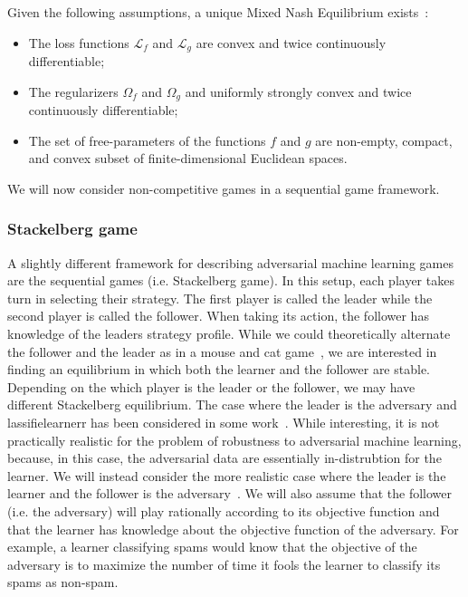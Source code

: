 Given the following assumptions, a unique Mixed Nash Equilibrium exists~\cite{bruckner_static_aml}:
\begin{itemize}
    \item The loss functions $\mathcal{L}_f$ and $\mathcal{L}_g$ are convex and twice continuously differentiable;
    \item The regularizers $\Omega_f$ and $\Omega_g$ and uniformly strongly convex and twice continuously differentiable;
    \item The set of free-parameters of the functions $f$ and $g$ are non-empty, compact, and convex subset of finite-dimensional Euclidean spaces.
\end{itemize}

We will now consider non-competitive games in a sequential game framework.

\subsubsection{Stackelberg game} A slightly different framework for describing adversarial machine learning games are the sequential games (i.e. Stackelberg game). In this setup, each player takes turn in selecting their strategy. The first player is called the leader while the second player is called the follower. When taking its action, the follower has knowledge of the leaders strategy profile. While we could theoretically alternate the follower and the leader as in a mouse and cat game~\cite{barreno_security_ml}, we are interested in finding an equilibrium in which both the learner and the follower are stable. Depending on the which player is the leader or the follower, we may have different Stackelberg equilibrium. The case where the leader is the adversary and lassifielearnerr has been considered in some work~\cite{murat_adversarial_classification,liu_game_theoretical_aml}. While interesting, it is not practically realistic for the problem of robustness to adversarial machine learning, because, in this case, the adversarial data are essentially in-distrubtion for the learner. We will instead consider the more realistic case where the leader is the learner and the follower is the adversary~\cite{bruckner_stackelberg}. We will also assume that the follower (i.e. the adversary) will play rationally according to its objective function and that the learner has knowledge about the objective function of the adversary. For example, a learner classifying spams would know that the objective of the adversary is to maximize the number of time it fools the learner to classify its spams as non-spam.

